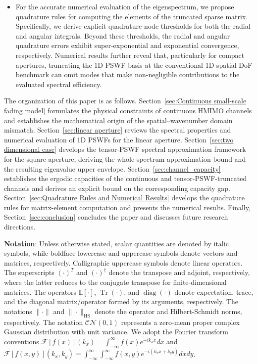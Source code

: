 \documentclass[lettersize,journal]{IEEEtran}
\theoremstyle{plain}
\begin{document}
\begin{itemize}
	\item
	For the accurate numerical evaluation of the eigenspectrum, we propose quadrature rules for computing the elements of the truncated sparse matrix. Specifically, we derive explicit quadrature-node thresholds for both the radial and angular integrals. Beyond these thresholds, the radial and angular quadrature errors exhibit super-exponential and exponential convergence, respectively. 
	Numerical results further reveal that, particularly for compact apertures, truncating the 1D PSWF basis at the conventional 1D spatial DoF benchmark can omit modes that make non-negligible contributions to the evaluated spectral efficiency.
\end{itemize}

The organization of this paper is as follows.
Section~\ref{sec:Continuous small-scale fading model} formulates the physical constraints of continuous HMIMO channels and establishes the mathematical origin of the spatial--wavenumber domain mismatch. Section~\ref{sec:linear aperture} reviews the spectral properties and numerical evaluation of 1D PSWFs for the linear aperture. Section~\ref{sec:two dimensional case} develops the tensor-PSWF spectral approximation framework for the square aperture, deriving the whole-spectrum approximation bound and the resulting eigenvalue upper envelope. Section~\ref{sec:channel_capacity} establishes the ergodic capacities of the continuous and tensor-PSWF-truncated channels and derives an explicit bound on the corresponding capacity gap. Section~\ref{sec:Quadrature Rules and Numerical Results} develops the quadrature rules for matrix-element computation and presents the numerical results. Finally, Section~\ref{sec:conclusion} concludes the paper and discusses future research directions.

\textbf{Notation}: Unless otherwise stated, scalar quantities are denoted by italic symbols, while boldface lowercase and uppercase symbols denote vectors and matrices, respectively. Calligraphic uppercase symbols denote linear operators. The superscripts $(\cdot)^T$ and $(\cdot)^{\dagger}$ denote the transpose and adjoint, respectively, where the latter reduces to the conjugate transpose for finite-dimensional matrices. The operators $\mathbb{E}[\cdot]$, $\operatorname{Tr}(\cdot)$, and $\operatorname{diag}(\cdot)$ denote expectation, trace, and the diagonal matrix/operator formed by its arguments, respectively. The notations $\|\cdot\|$ and $\|\cdot\|_{\mathrm{HS}}$ denote the operator and Hilbert-Schmidt norms, respectively. The notation $\mathcal{CN}(0, 1)$ represents a zero-mean proper complex Gaussian distribution with unit variance. We adopt the Fourier transform conventions $\mathcal{F}[f(x)](k_x) = \int_{-\infty}^{\infty}f(x)e^{-ik_x x} dx$ and $\mathcal{F}[f(x, y)](k_x, k_y) = \int_{-\infty}^{\infty}\int_{-\infty}^{\infty}f(x,y)e^{-i(k_x x + k_y y)} dxdy$.
	
\end{document}
